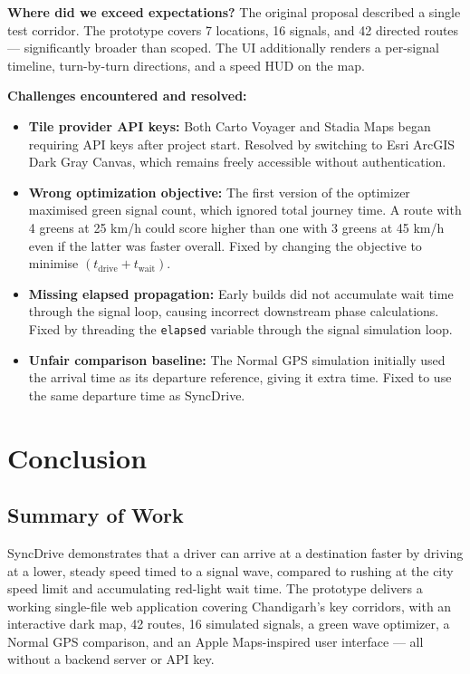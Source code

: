 \documentclass[12pt,a4paper]{report}
\begin{document}
\textbf{Where did we exceed expectations?} The original proposal described a
single test corridor. The prototype covers 7 locations, 16 signals, and 42
directed routes --- significantly broader than scoped. The UI additionally
renders a per-signal timeline, turn-by-turn directions, and a speed HUD on
the map.

\textbf{Challenges encountered and resolved:}

\begin{itemize}
  \item \textbf{Tile provider API keys:} Both Carto Voyager and Stadia Maps
    began requiring API keys after project start. Resolved by switching to
    Esri ArcGIS Dark Gray Canvas, which remains freely accessible without
    authentication.
  \item \textbf{Wrong optimization objective:} The first version of the
    optimizer maximised green signal count, which ignored total journey time.
    A route with 4 greens at 25 km/h could score higher than one with 3 greens
    at 45 km/h even if the latter was faster overall. Fixed by changing the
    objective to minimise $(t_{\text{drive}} + t_{\text{wait}})$.
  \item \textbf{Missing elapsed propagation:} Early builds did not accumulate
    wait time through the signal loop, causing incorrect downstream phase
    calculations. Fixed by threading the \texttt{elapsed} variable through the
    signal simulation loop.
  \item \textbf{Unfair comparison baseline:} The Normal GPS simulation
    initially used the arrival time as its departure reference, giving it extra
    time. Fixed to use the same departure time as SyncDrive.
\end{itemize}

\chapter{Conclusion}

\section{Summary of Work}

SyncDrive demonstrates that a driver can arrive at a destination faster by
driving at a lower, steady speed timed to a signal wave, compared to rushing
at the city speed limit and accumulating red-light wait time. The prototype
delivers a working single-file web application covering Chandigarh's key
corridors, with an interactive dark map, 42 routes, 16 simulated signals, a
green wave optimizer, a Normal GPS comparison, and an Apple Maps-inspired user
interface --- all without a backend server or API key.
\end{document}
